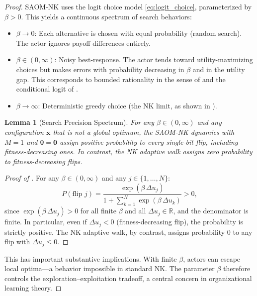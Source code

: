 \documentclass[12pt]{article}
\newtheorem{lemma}{Lemma}
\newcommand{\R}{\mathbb{R}}
\newcommand{\bx}{\mathbf{x}}
\newcommand{\btheta}{\boldsymbol{\theta}}
\begin{document}
\begin{proof}
SAOM-NK uses the logit choice model \eqref{eq:logit_choice}, parameterized by
$\beta > 0$. This yields a continuous spectrum of search behaviors:
\begin{itemize}
  \item $\beta \to 0$: Each alternative is chosen with equal probability
        (random search). The actor ignores payoff differences entirely.
  \item $\beta \in (0, \infty)$: Noisy best-response. The actor tends toward
        utility-maximizing choices but makes errors with probability
        decreasing in $\beta$ and in the utility gap. This corresponds to
        bounded rationality in the sense of \citet{blume1993statistical}
        and the conditional logit of \citet{mcfadden1974conditional}.
  \item $\beta \to \infty$: Deterministic greedy choice (the NK limit, as
        shown in ).
\end{itemize}

\begin{lemma}[Search Precision Spectrum]
\label{lem:search_precision}
For any $\beta \in (0, \infty)$ and any configuration $\bx$ that is not a
global optimum, the SAOM-NK dynamics with $M=1$ and $\btheta = \mathbf{0}$
assign positive probability to \emph{every} single-bit flip, including
fitness-decreasing ones. In contrast, the NK adaptive walk assigns zero
probability to fitness-decreasing flips.
\end{lemma}

\begin{proof}[Proof of ]
For any $\beta \in (0, \infty)$ and any $j \in \{1, \ldots, N\}$:
\begin{equation*}
  P(\text{flip } j) = \frac{\exp(\beta \, \Delta u_j)}{1 + \sum_{k=1}^{N} \exp(\beta \, \Delta u_k)} > 0,
\end{equation*}
since $\exp(\beta \, \Delta u_j) > 0$ for all finite $\beta$ and all
$\Delta u_j \in \R$, and the denominator is finite. In particular, even if
$\Delta u_j < 0$ (fitness-decreasing flip), the probability is strictly
positive. The NK adaptive walk, by contrast, assigns probability 0 to any
flip with $\Delta u_j \leq 0$.
\end{proof}

This has important substantive implications. With finite $\beta$, actors can
escape local optima---a behavior impossible in standard NK. The parameter
$\beta$ therefore controls the exploration--exploitation tradeoff, a central
concern in organizational learning theory.


\end{proof}
\end{document}

